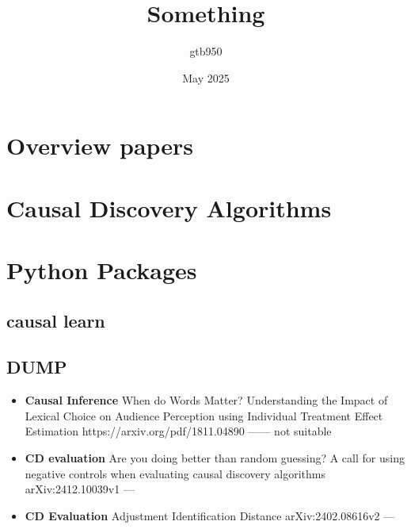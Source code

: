 \documentclass{article}
\title{Something}
\author{gtb950 }
\date{May 2025}
\begin{document}
\maketitle

\section{Overview papers}

\section{Causal Discovery Algorithms}
\section{Python Packages}
\subsection{causal learn}



\subsection{DUMP}
\begin{itemize}
    \item \textbf{Causal Inference} When do Words Matter? Understanding the Impact of Lexical Choice on
Audience Perception using Individual Treatment Effect Estimation https://arxiv.org/pdf/1811.04890    ------ not suitable
 \item \textbf{CD evaluation} Are you doing better than random guessing? A call for
 using negative controls when evaluating causal discovery
 algorithms   arXiv:2412.10039v1 --- 

 \item \textbf{CD Evaluation} Adjustment Identification Distance  arXiv:2402.08616v2  --- 
\end{itemize}
 

\
\end{document}

